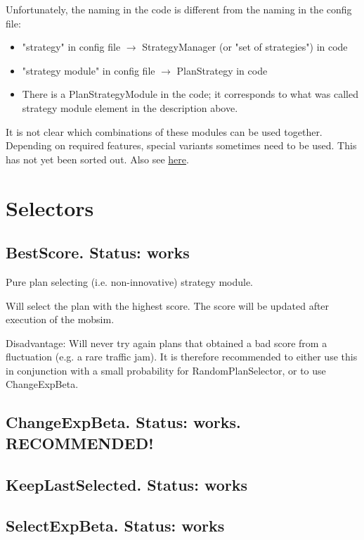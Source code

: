 Unfortunately, the naming in the code is different from the naming in the config file:
\begin{itemize}
	\item "strategy" in config file $\rightarrow$ StrategyManager (or "set of strategies") in code
	\item "strategy module" in config file $\rightarrow$ PlanStrategy in code
	\item There is a PlanStrategyModule in the code; it corresponds to what was called strategy module element in the description above.
\end{itemize}

It is not clear which combinations of these modules can be used  together. Depending on required features, special variants sometimes  need to be used. This has not yet been sorted out. Also see \href{http://matsim.org/node/690}{here}.


\vfill\eject
\section{Selectors}
\label{sec:selectors}

\subsection{BestScore.  Status: works}

Pure plan selecting (i.e. non-innovative) strategy module.

Will select the plan with the highest score. The score will be updated after execution of the mobsim.

Disadvantage: Will never try again plans that obtained a bad score  from a fluctuation (e.g. a rare traffic jam). It is therefore  recommended to either use this in conjunction with a small probability  for RandomPlanSelector, or to use ChangeExpBeta.

\subsection{ChangeExpBeta. Status: works. RECOMMENDED!}

\subsection{KeepLastSelected. Status: works}

\subsection{SelectExpBeta. Status: works}

